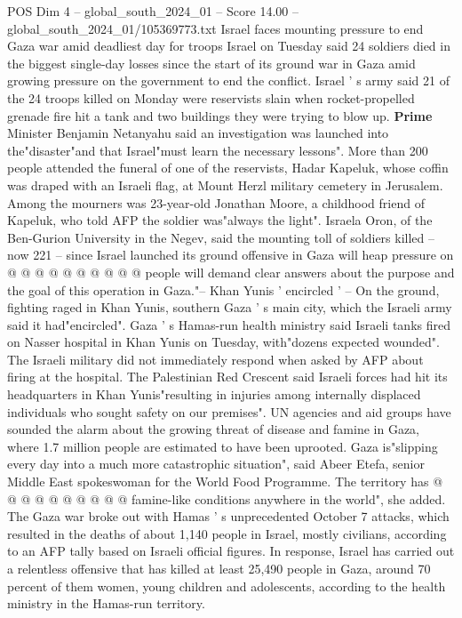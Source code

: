 \begin{textsample}{POS Dim 4 – global\_south\_2024\_01 – Score 14.00 – global\_south\_2024\_01/105369773.txt}  \label{ex:f4_pos_377}
Israel faces mounting pressure to end Gaza war amid deadliest day for troops Israel on Tuesday said 24 soldiers died in the biggest single-day losses since the start of its ground war in Gaza amid growing pressure on the government to end the conflict.
Israel ' s army said 21 of the 24 troops killed on Monday were reservists slain when rocket-propelled grenade fire hit a tank and two buildings they were trying to blow up. \textbf{Prime} Minister Benjamin Netanyahu said an investigation was launched into the"disaster"and that Israel"must learn the necessary lessons".
More than 200 people attended the funeral of one of the reservists, Hadar Kapeluk, whose coffin was draped with an Israeli flag, at Mount Herzl military cemetery in Jerusalem.
Among the mourners was 23-year-old Jonathan Moore, a childhood friend of Kapeluk, who told AFP the soldier was"always the light".
Israela Oron, of the Ben-Gurion University in the Negev, said the mounting toll of soldiers killed -- now 221 -- since Israel launched its ground offensive in Gaza will heap pressure on @ @ @ @ @ @ @ @ @ @ people will demand clear answers about the purpose and the goal of this operation in Gaza."-- Khan Yunis ' encircled ' -- On the ground, fighting raged in Khan Yunis, southern Gaza ' s main city, which the Israeli army said it had"encircled".
Gaza ' s Hamas-run health ministry said Israeli tanks fired on Nasser hospital in Khan Yunis on Tuesday, with"dozens expected wounded".
The Israeli military did not immediately respond when asked by AFP about firing at the hospital.
The Palestinian Red Crescent said Israeli forces had hit its headquarters in Khan Yunis"resulting in injuries among internally displaced individuals who sought safety on our premises".
UN agencies and aid groups have sounded the alarm about the growing threat of disease and famine in Gaza, where 1.7 million people are estimated to have been uprooted.
Gaza is"slipping every day into a much more catastrophic situation", said Abeer Etefa, senior Middle East spokeswoman for the World Food Programme.
The territory has @ @ @ @ @ @ @ @ @ @ famine-like conditions anywhere in the world", she added.
The Gaza war broke out with Hamas ' s unprecedented October 7 attacks, which resulted in the deaths of about 1,140 people in Israel, mostly civilians, according to an AFP tally based on Israeli official figures.
In response, Israel has carried out a relentless offensive that has killed at least 25,490 people in Gaza, around 70 percent of them women, young children and adolescents, according to the health ministry in the Hamas-run territory.

\end{textsample}
